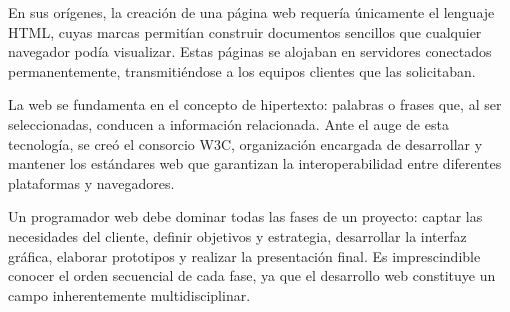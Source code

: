 


En sus orígenes, la creación de una página web requería únicamente el lenguaje HTML, cuyas marcas permitían construir documentos sencillos que cualquier navegador podía visualizar. Estas páginas se alojaban en servidores conectados permanentemente, transmitiéndose a los equipos clientes que las solicitaban.

La web se fundamenta en el concepto de hipertexto: palabras o frases que, al ser seleccionadas, conducen a información relacionada. Ante el auge de esta tecnología, se creó el consorcio W3C, organización encargada de desarrollar y mantener los estándares web que garantizan la interoperabilidad entre diferentes plataformas y navegadores.

Un programador web debe dominar todas las fases de un proyecto: captar las necesidades del cliente, definir objetivos y estrategia, desarrollar la interfaz gráfica, elaborar prototipos y realizar la presentación final. Es imprescindible conocer el orden secuencial de cada fase, ya que el desarrollo web constituye un campo inherentemente multidisciplinar.

